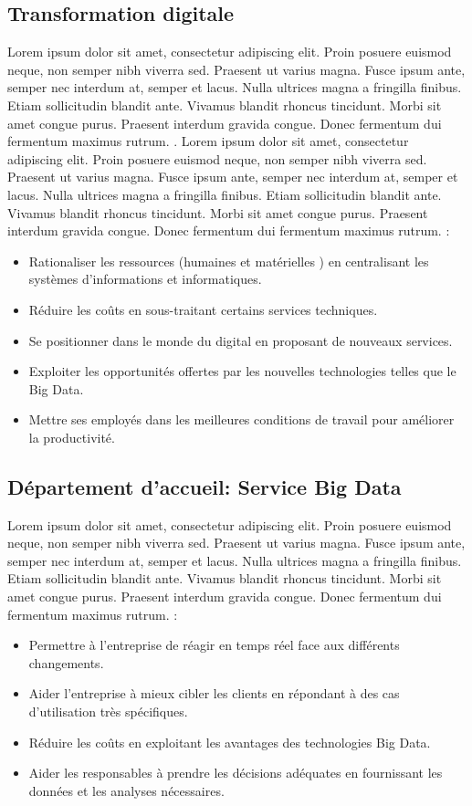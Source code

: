 \subsection{Transformation digitale}
Lorem ipsum dolor sit amet, consectetur adipiscing elit. Proin posuere euismod neque, non semper nibh viverra sed. Praesent ut varius magna. Fusce ipsum ante, semper nec interdum at, semper et lacus. Nulla ultrices magna a fringilla finibus. Etiam sollicitudin blandit ante. Vivamus blandit rhoncus tincidunt. Morbi sit amet congue purus. Praesent interdum gravida congue. Donec fermentum dui fermentum maximus rutrum. \parencite{dabi-schwebel_transformation_2019}. Lorem ipsum dolor sit amet, consectetur adipiscing elit. Proin posuere euismod neque, non semper nibh viverra sed. Praesent ut varius magna. Fusce ipsum ante, semper nec interdum at, semper et lacus. Nulla ultrices magna a fringilla finibus. Etiam sollicitudin blandit ante. Vivamus blandit rhoncus tincidunt. Morbi sit amet congue purus. Praesent interdum gravida congue. Donec fermentum dui fermentum maximus rutrum. :
\begin{itemize}
  \item Rationaliser les ressources (humaines et matérielles ) en centralisant les systèmes d'informations et informatiques.
  \item Réduire les coûts en sous-traitant certains services techniques.
  \item Se positionner dans le monde du digital en proposant de nouveaux services.
  \item Exploiter les opportunités offertes par les nouvelles technologies telles que le Big Data.
  \item Mettre ses employés dans les meilleures conditions de travail pour améliorer la productivité.
\end{itemize}

\medskip

\subsection{Département d'accueil: Service Big Data}
Lorem ipsum dolor sit amet, consectetur adipiscing elit. Proin posuere euismod neque, non semper nibh viverra sed. Praesent ut varius magna. Fusce ipsum ante, semper nec interdum at, semper et lacus. Nulla ultrices magna a fringilla finibus. Etiam sollicitudin blandit ante. Vivamus blandit rhoncus tincidunt. Morbi sit amet congue purus. Praesent interdum gravida congue. Donec fermentum dui fermentum maximus rutrum. :
\begin{itemize}
  \item Permettre à l'entreprise de réagir en temps réel face aux différents changements.
  \item Aider l'entreprise à mieux cibler les clients en répondant à des cas d'utilisation très spécifiques.
  \item Réduire les coûts en exploitant les avantages des technologies Big Data.
  \item Aider les responsables à prendre les décisions adéquates en fournissant les données et les analyses nécessaires.
\end{itemize}

